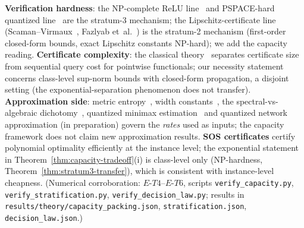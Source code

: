 \textbf{Verification hardness}: the NP-complete ReLU
line~\cite{katz2017reluplex} and PSPACE-hard quantized
line~\cite{hlz2021quantized} are the stratum-3 mechanism; the
Lipschitz-certificate line (Scaman--Virmaux~\cite{scaman2018lipschitz},
Fazlyab et~al.~\cite{fazlyab2019lipschitz}) is the stratum-2 mechanism
(first-order closed-form bounds, exact Lipschitz constants NP-hard);
we add the capacity reading. \textbf{Certificate complexity}: the
classical theory~\cite{buss2002capron} separates certificate size from
sequential query cost for pointwise functionals; our necessity
statement concerns class-level sup-norm bounds with closed-form
propagation, a disjoint setting (the exponential-separation phenomenon
does not transfer). \textbf{Approximation side}: metric
entropy~\cite{kolmogorov1959entropy}, width
constants~\cite{pinkus1985width}, the spectral-vs-algebraic
dichotomy~\cite{trefethen2013approximation,boyd2001chebyshev},
quantized minimax estimation~\cite{zhu2018quantized} and quantized
network approximation (in preparation) govern the \emph{rates} used as
inputs; the capacity framework does not claim new approximation
results. \textbf{SOS certificates} certify polynomial optimality
efficiently at the instance level; the exponential statement in
Theorem~\ref{thm:capacity-tradeoff}(i) is class-level only
(NP-hardness, Theorem~\ref{thm:stratum3-transfer}), which is
consistent with instance-level cheapness. (Numerical
corroboration: $E$-$T4$--$E$-$T6$, scripts
\texttt{verify\_capacity.py}, \texttt{verify\_stratification.py},
\texttt{verify\_decision\_law.py}; results in
\texttt{results/theory/capacity\_packing.json},
\texttt{stratification.json}, \texttt{decision\_law.json}.)
